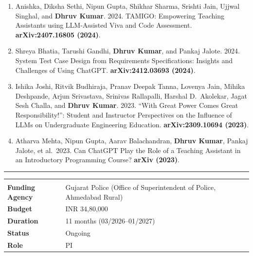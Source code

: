 \documentclass[10pt, a4paper]{article}
\newcommand{\cvsectionnn}[1]{%
  \vspace{1.0em}%
  \noindent{\large\bfseries\color{AccentBlue}#1}\par%
  \vspace{-0.5em}%
  {\color{AccentBlue}\rule{\linewidth}{1.5pt}}\par%
  \vspace{0.4em}%
}
\begin{document}
\begin{enumerate}[label=\textbf{P\arabic*.}, leftmargin=2.8em, itemsep=0.3em]
\item Anishka, Diksha Sethi, Nipun Gupta, Shikhar Sharma, Srishti Jain, Ujjwal Singhal, and \textbf{Dhruv Kumar}. 2024. TAMIGO: Empowering Teaching Assistants using LLM-Assisted Viva and Code Assessment. \textbf{arXiv:2407.16805 (2024)}.

\item Shreya Bhatia, Tarushi Gandhi, \textbf{Dhruv Kumar}, and Pankaj Jalote. 2024. System Test Case Design from Requirements Specifications: Insights and Challenges of Using ChatGPT. \textbf{arXiv:2412.03693 (2024)}.

\item Ishika Joshi, Ritvik Budhiraja, Pranav Deepak Tanna, Lovenya Jain, Mihika Deshpande, Arjun Srivastava, Srinivas Rallapalli, Harshal D.\ Akolekar, Jagat Sesh Challa, and \textbf{Dhruv Kumar}. 2023. ``With Great Power Comes Great Responsibility!'': Student and Instructor Perspectives on the Influence of LLMs on Undergraduate Engineering Education. \textbf{arXiv:2309.10694 (2023)}.

\item Atharva Mehta, Nipun Gupta, Aarav Balachandran, \textbf{Dhruv Kumar}, Pankaj Jalote, et al.\ 2023. Can ChatGPT Play the Role of a Teaching Assistant in an Introductory Programming Course? \textbf{arXiv (2023)}.

\end{enumerate}

\newpage
\cvsectionnn{Sponsored Research Projects}

\renewcommand{\arraystretch}{1.35}
\begin{tabularx}{\linewidth}{L{4.0cm} X}
   \\
  \textbf{Funding Agency}      & Gujarat Police (Office of Superintendent of Police, Ahmedabad Rural) \\
  \textbf{Budget}              & INR 34,80,000 \\
  \textbf{Duration}            & 11 months (03/2026--01/2027) \\
  \textbf{Status}              & \textcolor{AwardRed}{Ongoing} \\
  \textbf{Role}                & PI \\
\end{tabularx}
\end{document}
